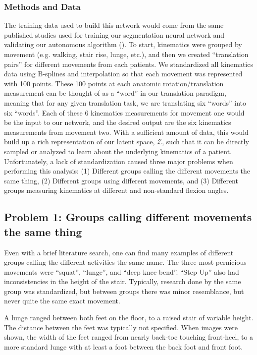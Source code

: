 \subsubsection{Methods and Data}
The training data used to build this network would come from the same published studies used for training our segmentation neural network and validating our autonomous algorithm ().
To start, kinematics were grouped by movement (e.g. walking, stair rise, lunge, etc.), and then we created ``translation pairs'' for different movements from each patients.
We standardized all kinematics data using B-splines and interpolation so that each movement was represented with 100 points.
These 100 points at each anatomic rotation/translation measurement can be thought of as a ``word'' in our translation paradigm, meaning that for any given translation task, we are translating six ``words'' into six ``words''.
Each of these 6 kinematics measurements for movement one would be the input to our network, and the desired output are the six kinematics measurements from movement two.
With a sufficient amount of data, this would build up a rich representation of our latent space, $\mathcal{Z}$, such that it can be directly sampled or analyzed to learn about the underlying kinematics of a patient.
Unfortunately, a lack of standardization caused three major problems when performing this analysis: (1) Different groups calling the different movements the same thing, (2) Different groups using different movements, and (3) Different groups measuring kinematics at different and non-standard flexion angles.

\subsection{Problem 1: Groups calling different movements the same thing}
Even with a brief literature search, one can find many examples of different groups calling the different activities the same name.
The three most pernicious movements were ``squat'', ``lunge'', and ``deep knee bend''. ``Step Up'' also had inconsistencies in the height of the stair.
Typically, research done by the same group was standardized, but between groups there was minor resemblance, but never quite the same exact movement.

A lunge ranged between both feet on the floor, to a raised stair of variable height. The distance between the feet was typically not specified.
When images were shown, the width of the feet ranged from nearly back-toe touching front-heel, to a more standard lunge with at least a foot between the back foot and front foot.

